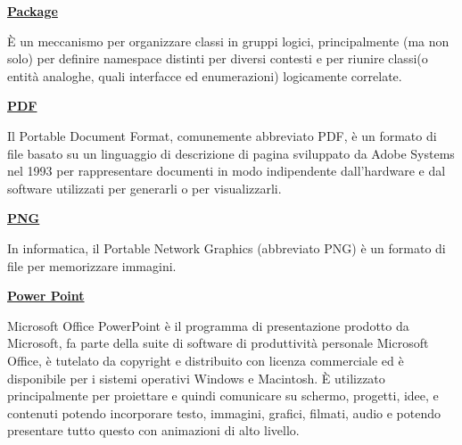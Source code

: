 \vspace*{2\bigskipamount}

\begin{addmargin}[0em]{0em}	
	\textbf{\underline{Package}} 
\end{addmargin}

\medskip
\begin{addmargin}[5em]{1em}	
È un meccanismo per organizzare classi in gruppi logici, principalmente (ma non solo) per definire namespace distinti per diversi contesti e per riunire classi(o entità analoghe, quali interfacce ed enumerazioni) logicamente correlate.
\end{addmargin}	

\bigskip

\begin{addmargin}[0em]{0em}	
	\textbf{\underline{PDF}} 
\end{addmargin}

\medskip
\begin{addmargin}[5em]{1em}	
Il Portable Document Format, comunemente abbreviato PDF, è un formato di file basato su un linguaggio di descrizione di pagina sviluppato da Adobe Systems nel 1993 per rappresentare documenti in modo indipendente dall'hardware e dal software utilizzati per generarli o per visualizzarli.
\end{addmargin}	

\bigskip
\begin{addmargin}[0em]{0em}	
	\textbf{\underline{PNG}} 
\end{addmargin}
\medskip
\begin{addmargin}[5em]{1em}
In informatica, il Portable Network Graphics (abbreviato PNG) è un formato di file per memorizzare immagini.
\end{addmargin}	

\bigskip
\begin{addmargin}[0em]{0em}	
	\textbf{\underline{Power Point}}
\end{addmargin} 

\medskip
\begin{addmargin}[5em]{1em}
Microsoft Office PowerPoint è il programma di presentazione prodotto da Microsoft, fa parte della suite di software di produttività personale Microsoft Office, è tutelato da copyright e distribuito con licenza commerciale ed è disponibile per i sistemi operativi Windows e Macintosh. È utilizzato principalmente per proiettare e quindi comunicare su schermo, progetti, idee, e contenuti potendo incorporare testo, immagini, grafici, filmati, audio e potendo presentare tutto questo con animazioni di alto livello.
\end{addmargin}	

